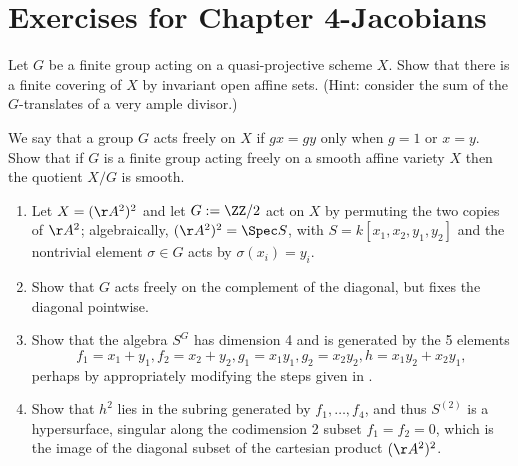 

\chapter{Exercises for Chapter 4-Jacobians}


\begin{exercise}
 Let $G$ be a finite group acting on a quasi-projective scheme $X$. Show that there is a finite covering of $X$ by invariant open affine sets. (Hint: consider the sum of the $G$-translates of a very ample divisor.)
\end{exercise}


\begin{exercise}\label{free actions}
We say that a group $G$ acts freely on $X$ if $gx = gy$ only when $g =1$ or $x=y$. Show that
 if $G$ is a finite group acting freely on a smooth affine variety $X$ then the quotient $X/G$ is smooth.
\end{exercise}


\begin{exercise}
 \label{sym2A2} 
 \begin{enumerate}
 \item Let $X = (\AA^{2})^{2}$ and let $G := \ZZ/2$ act on $X$ by permuting the two copies of  $\AA^{2}$; algebraically,
$(\AA^{2})^{2} = \Spec S$, with $S = k[x_{1},x_{2}, y_{1}, y_{2}]$ and the nontrivial element $\sigma\in G$ acts by
$\sigma(x_{i}) = y_{i}$. 
\item Show that $G$ acts freely on the complement of the diagonal, but fixes the diagonal pointwise.
\item Show that the algebra $S^{G}$ has dimension 4 and is generated by the 5 elements
$$ 
f_{1} = x_{1}+y_{1}, f_{2} = x_{2}+y_{2}, g_{1} = x_{1}y_{1}, g_{2} = x_{2}y_{2}, h = x_{1}y_{2}+x_{2}y_{1},
$$
perhaps by appropriately modifying the steps given in \cite[Exercise 1.6]{Eisenbud1995}. 
\item Show that $h^2$ lies in the subring generated by $f_1,\dots, f_4$, and thus $S^{(2)}$ is a hypersurface, singular
along the  codimension 2 subset $f_{1} = f_{2} = 0$, which is the image of the diagonal subset of the 
cartesian product $(\AA^{2})^{2}$.
\end{enumerate}
\end{exercise}



